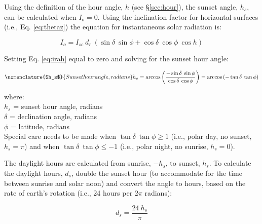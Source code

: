 Using the definition of the hour angle, $h$ (see \S \ref{sec:hour}), the sunset angle, $h_s$, can be calculated when $I_o = 0$. 
Using the inclination factor for horizontal surfaces (i.e., Eq. \ref{eq:thetaz}) the equation for instantaneous solar radiation is:

\begin{equation}
\label{eq:irah}
	I_o = I_{sc}\: d_r\: \left( \sin\delta\: \sin\phi + 
	      \cos\delta\: \cos\phi\: \cos h \right)
\end{equation}

\noindent Setting Eq. \ref{eq:irah} equal to zero and solving for the sunset hour angle:

\begin{equation}
\nomenclature{$h_s$}{Sunset hour angle, radians}
\label{eq:hs}
	h_s  = \arccos\left(\frac{-\sin\delta\: \sin\phi}
		                          {\cos\delta\: \cos\phi}\right)
		 = \arccos\left(-\tan\delta\: \tan\phi\right)
\end{equation}

\noindent where:\\
\indent $h_s$ = sunset hour angle, radians\\
\indent $\delta$ = declination angle, radians\\
\indent $\phi$ = latitude, radians\\

\noindent Special care needs to be made when $\tan\delta\:\tan\phi \geq 1$ (i.e., polar day, no sunset, $h_s = \pi$) and when $\tan\delta\:\tan\phi \leq -1$ (i.e., polar night, no sunrise, $h_s = 0$).

The daylight hours are calculated from sunrise, $-h_s$, to sunset, $h_s$. 
To calculate the daylight hours, $d_s$, double the sunset hour (to accommodate for the time between sunrise and solar noon) and convert the angle to hours, based on the rate of earth's rotation (i.e., 24 hours per $2\pi$ radians):

\begin{equation}
\label{eq:ds}
	d_s  = \frac{24\: h_s}{\pi}
\end{equation}

